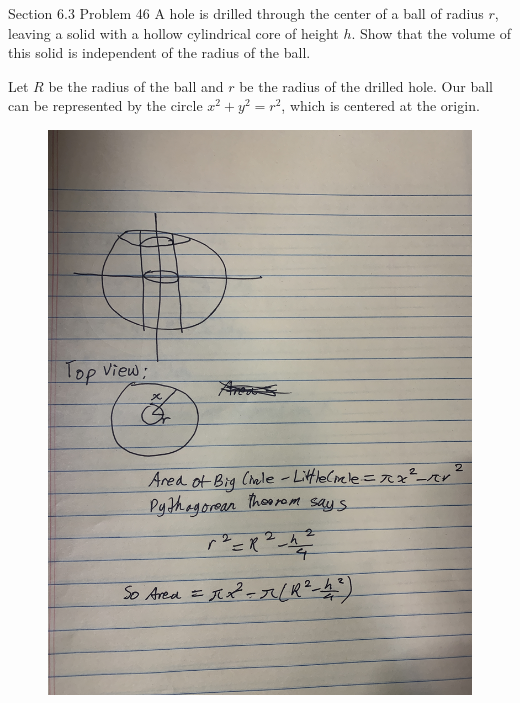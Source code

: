 \documentclass{article}
\begin{document}
    \begin{tbhtheorem}{Section 6.3 Problem 46}
        A hole is drilled through the center of a ball of radius $r$, leaving a solid with a hollow cylindrical core of height $h$. Show that the volume of this solid is independent of the radius of the ball.
    \end{tbhtheorem}

    Let $R$ be the radius of the ball and $r$ be the radius of the drilled hole. Our ball can be represented by the circle $x^2+y^2=r^2$, which is centered at the origin.

    \begin{figure}[hbt!]
        \centering
        \includegraphics[scale=0.08]{drill}
    \end{figure}
\end{document}
